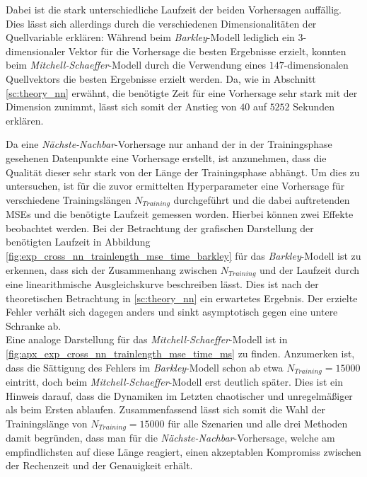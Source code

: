 Dabei ist die stark unterschiedliche Laufzeit der beiden Vorhersagen auffällig. Dies lässt sich allerdings durch die verschiedenen Dimensionalitäten der Quellvariable erklären: Während beim \textit{Barkley}-Modell lediglich ein $3$-dimensionaler Vektor für die Vorhersage die besten Ergebnisse erzielt, konnten beim \textit{Mitchell-Schaeffer}-Modell durch die Verwendung eines $147$-dimensionalen Quellvektors die besten Ergebnisse erzielt werden. Da, wie in Abschnitt \ref{sc:theory_nn} erwähnt, die benötigte Zeit für eine Vorhersage sehr stark mit der Dimension zunimmt, lässt sich somit der Anstieg von $40$ auf $5252$ Sekunden erklären.

Da eine \textit{Nächste-Nachbar}-Vorhersage nur anhand der in der Trainingsphase gesehenen Datenpunkte eine Vorhersage erstellt, ist anzunehmen, dass die Qualität dieser sehr stark von der Länge der Trainingsphase abhängt. Um dies zu untersuchen, ist für die zuvor ermittelten Hyperparameter eine Vorhersage für verschiedene Trainingslängen $N_{Training}$ durchgeführt und die dabei auftretenden MSEs und die benötigte Laufzeit gemessen worden. Hierbei können zwei Effekte beobachtet werden. Bei der Betrachtung der grafischen Darstellung der benötigten Laufzeit in Abbildung \ref{fig:exp_cross_nn_trainlength_mse_time_barkley} für das \textit{Barkley}-Modell ist zu erkennen, dass sich der Zusammenhang zwischen $N_{Training}$ und der Laufzeit durch eine linearithmische Ausgleichskurve beschreiben lässt. Dies ist nach der theoretischen Betrachtung in \ref{sc:theory_nn} ein erwartetes Ergebnis. Der erzielte Fehler verhält sich dagegen anders und sinkt asymptotisch gegen eine untere Schranke ab.\\

Eine analoge Darstellung für das \textit{Mitchell-Schaeffer}-Modell ist in \ref{fig:apx_exp_cross_nn_trainlength_mse_time_ms} zu finden. Anzumerken ist, dass die Sättigung des Fehlers im \textit{Barkley}-Modell schon ab etwa $N_{Training}=15000$ eintritt, doch beim \textit{Mitchell-Schaeffer}-Modell erst deutlich später. Dies ist ein Hinweis darauf, dass die Dynamiken im Letzten chaotischer und unregelmäßiger als beim Ersten ablaufen. Zusammenfassend lässt sich somit die Wahl der Trainingslänge von $N_{Training} = 15000$ für alle Szenarien und alle drei Methoden damit begründen, dass man für die \textit{Nächste-Nachbar}-Vorhersage, welche am empfindlichsten auf diese Länge reagiert, einen akzeptablen Kompromiss zwischen der Rechenzeit und der Genauigkeit erhält.

